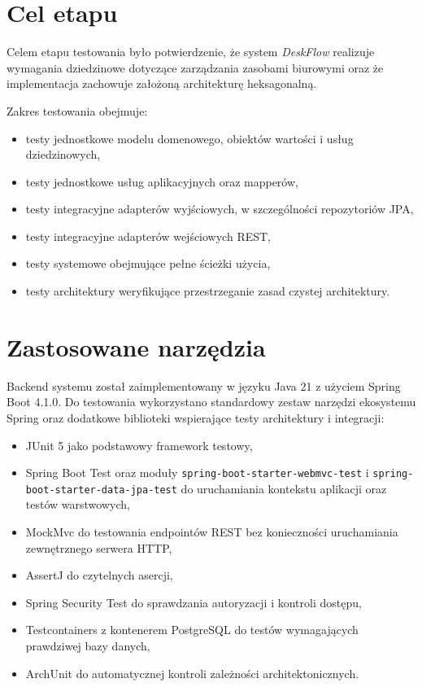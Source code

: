 \label{chapter:rozdzialtrzeci}

\section{Cel etapu}

Celem etapu testowania było potwierdzenie, że system \textit{DeskFlow} realizuje wymagania dziedzinowe dotyczące zarządzania zasobami biurowymi oraz że implementacja zachowuje założoną architekturę heksagonalną.

Zakres testowania obejmuje:
\begin{itemize}
    \item testy jednostkowe modelu domenowego, obiektów wartości i usług dziedzinowych,
    \item testy jednostkowe usług aplikacyjnych oraz mapperów,
    \item testy integracyjne adapterów wyjściowych, w szczególności repozytoriów JPA,
    \item testy integracyjne adapterów wejściowych REST,
    \item testy systemowe obejmujące pełne ścieżki użycia,
    \item testy architektury weryfikujące przestrzeganie zasad czystej architektury.
\end{itemize}

\section{Zastosowane narzędzia}

Backend systemu został zaimplementowany w języku Java 21 z użyciem Spring Boot 4.1.0. Do testowania wykorzystano standardowy zestaw narzędzi ekosystemu Spring oraz dodatkowe biblioteki wspierające testy architektury i integracji:
\begin{itemize}
    \item JUnit 5 jako podstawowy framework testowy,
    \item Spring Boot Test oraz moduły \texttt{spring-boot-starter-webmvc-test} i \texttt{spring-boot-starter-data-jpa-test} do uruchamiania kontekstu aplikacji oraz testów warstwowych,
    \item MockMvc do testowania endpointów REST bez konieczności uruchamiania zewnętrznego serwera HTTP,
    \item AssertJ do czytelnych asercji,
    \item Spring Security Test do sprawdzania autoryzacji i kontroli dostępu, 
    \item Testcontainers z kontenerem PostgreSQL do testów wymagających prawdziwej bazy danych,
    \item ArchUnit do automatycznej kontroli zależności architektonicznych.
\end{itemize}

